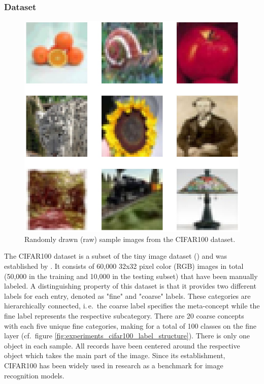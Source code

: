 \subsubsection{Dataset%
               \label{sec:experiments_cifar100_dataset}}

\begin{figure}[htb]
    \centering
	    \includegraphics[width=\textwidth]{thesis/graphics/images/cifar100_sample_images.jpg}
    \caption{Randomly drawn (raw) sample images from the CIFAR100 dataset.}
    \label{fig:experiments_cifar100_sample_images}
\end{figure}
     
The CIFAR100 dataset is a subset of the tiny image dataset (\cite{Torralba2008-ah}) and was established by \cite{Krizhevsky2009-wt}. It consists of 60,000 32x32 pixel color (RGB) images in total (50,000 in the training and 10,000 in the testing subset) that have been manually labeled. A distinguishing property of this dataset is that it provides two different labels for each entry, denoted as "fine" and "coarse" labels. These categories are hierarchically connected, i.\,e.\ the coarse label specifies the meta-concept while the fine label represents the respective subcategory. There are 20 coarse concepts with each five unique fine categories, making for a total of 100 classes on the fine layer (cf.\ figure \ref{fig:experiments_cifar100_label_structure}). There is only one object in each sample. All records have been centered around the respective object which takes the main part of the image. Since its establishment, CIFAR100 has been widely used in research as a benchmark for image recognition models.

